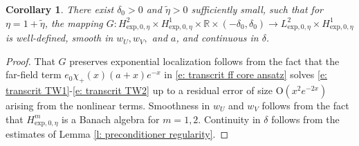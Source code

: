 \documentclass[11pt]{article}
\newcommand{\R}{\mathbb{R}}
\newtheorem{corollary}[prop]{Corollary}
\numberwithin{equation}{section}
\numberwithin{prop}{section}
\begin{document}
\begin{corollary}
	There exist $\delta_0 > 0$ and $\tilde{\eta}> 0$ sufficiently small, such that for $\eta = 1 + \tilde{\eta}$, the mapping $G : H^2_{\mathrm{exp}, 0, \eta} \times H^1_{\mathrm{exp}, 0, \eta} \times \R \times (-\delta_0, \delta_0) \to L^2_{\mathrm{exp}, 0, \eta} \times H^1_{\mathrm{exp}, 0, \eta}$ is well-defined, smooth in $w_U, w_V,$ and $a$, and continuous in $\delta$. 
\end{corollary}
\begin{proof}
	That $G$ preserves exponential localization follows from the fact that the far-field term $e_0 \chi_+(x) (a+x)e^{-x}$ in \eqref{e: transcrit ff core ansatz} solves \eqref{e: transcrit TW1}-\eqref{e: transcrit TW2} up to a residual error of size $\mathrm{O}(x^2 e^{-2x})$ arising from the nonlinear terms. Smoothness in $w_U$ and $w_V$ follows from the fact that $H^m_{\mathrm{exp}, 0, \eta}$ is a Banach algebra for $m = 1, 2$. Continuity in $\delta$ follows from the estimates of Lemma \ref{l: preconditioner regularity}. 
\end{proof}
\end{document}

